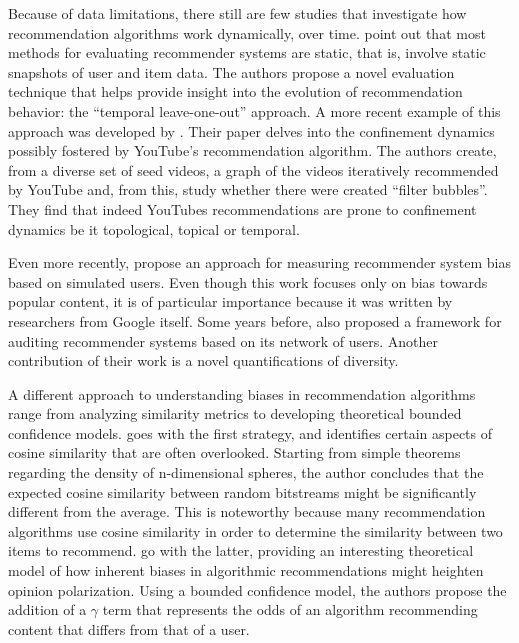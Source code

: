 Because of data limitations, there still are few studies that investigate how
recommendation algorithms work dynamically, over time.
\citet{burke_evaluating_2010} point out that most methods for evaluating
recommender systems are static, that is, involve static snapshots of user and
item data. The authors propose a novel evaluation technique that helps provide
insight into the evolution of recommendation behavior: the ``temporal
leave-one-out'' approach. A more recent example of this approach was developed
by \citet{roth_tubes_2020}. Their paper delves into the confinement dynamics
possibly fostered by YouTube's recommendation algorithm. The authors create,
from a diverse set of seed videos, a graph of the videos iteratively recommended
by YouTube and, from this, study whether there were created ``filter bubbles''.
They find that indeed YouTubes recommendations are prone to confinement dynamics
be it topological, topical or temporal.

Even more recently, \citet{yao_measuring_2021} propose an approach for measuring
recommender system bias based on simulated users. Even though this work focuses
only on bias towards popular content, it is of particular importance because it
was written by researchers from Google itself. Some years before,
\citet{dash_network-centric_2019} also proposed a framework for auditing
recommender systems based on its network of users. Another contribution of their
work is a novel quantifications of diversity.

A different approach to understanding biases in recommendation algorithms range
from analyzing similarity metrics to developing theoretical bounded confidence
models. \citet{giller_statistical_2012} goes with the first strategy, and
identifies certain aspects of cosine similarity that are often overlooked.
Starting from simple theorems regarding the density of n-dimensional spheres,
the author concludes that the expected cosine similarity between random
bitstreams might be significantly different from the average. This is noteworthy
because many recommendation algorithms use cosine similarity in order to
determine the similarity between two items to recommend.
\citet{sirbu_algorithmic_2019} go with the latter, providing an interesting
theoretical model of how inherent biases in algorithmic recommendations might
heighten opinion polarization. Using a bounded confidence model, the authors
propose the addition of a $\gamma$ term that represents the odds of an algorithm
recommending content that differs from that of a user.

